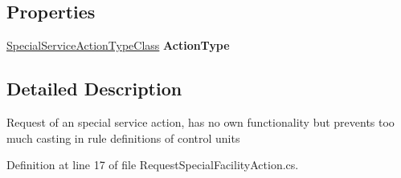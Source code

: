 \subsection*{Properties}
\begin{DoxyCompactItemize}
\item 
\hyperlink{class_general_health_care_elements_1_1_general_classes_1_1_action_types_and_paths_1_1_special_service_action_type_class}{Special\+Service\+Action\+Type\+Class} {\bfseries Action\+Type}\hypertarget{class_general_health_care_elements_1_1_special_facility_1_1_request_special_facility_action_a68d932cda261a4da6006df1de8348b3a}{}\label{class_general_health_care_elements_1_1_special_facility_1_1_request_special_facility_action_a68d932cda261a4da6006df1de8348b3a}

\end{DoxyCompactItemize}


\subsection{Detailed Description}
Request of an special service action, has no own functionality but prevents too much casting in rule definitions of control units 



Definition at line 17 of file Request\+Special\+Facility\+Action.\+cs.

